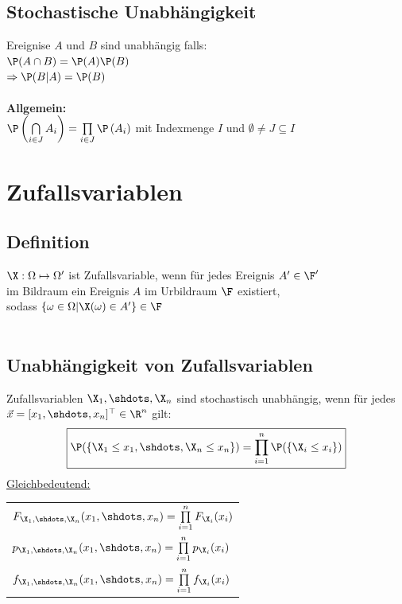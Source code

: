 \documentclass[german,color,6pt]{latex4ei/latex4ei_sheet}
\begin{document}
\begin{sectionbox}
	\subsection{Stochastische Unabhängigkeit}
	Ereignise $A$ und $B$ sind unabhängig falls:\\
	$\P(A \cap B) = \P(A)\P(B)$ \\
	$\Rightarrow \P(B|A)=\P(B)$  \\ \\
	\textbf{Allgemein:}  \\
	$\P\left(\bigcap\limits_{i \in J} A_i\right) = \prod\limits_{i \in J}\P\left(A_i\right)$
	mit Indexmenge $I$ und $\emptyset \neq J \subseteq I$
\end{sectionbox}


\section{Zufallsvariablen}
\begin{sectionbox}
	\subsection{Definition}
	$\X : \Omega \mapsto \Omega'$ ist Zufallsvariable, wenn für jedes Ereignis $A' \in \F'$  \\
	im Bildraum ein Ereignis $A$ im Urbildraum $\F$ existiert, \\
	sodass $\left\{\omega \in \Omega|\X(\omega) \in A'\right\} \in \F$\\ \\
\end{sectionbox}

\begin{sectionbox}
	\subsection{Unabhängigkeit von Zufallsvariablen}
	Zufallsvariablen $\X_1,\shdots,\X_n$ sind stochastisch unabhängig, wenn für jedes $\vec{x} = [x_1,\shdots,x_n]^\top \in \R^n$ gilt:
	\[\boxed{\P(\{\X_1 \leq x_1,\shdots,\X_n \leq x_n\}) = \prod\limits_{i=1}^{n}{\P(\{\X_i \leq x_i\})}}\]
	\underline{Gleichbedeutend:}\\
	\begin{tabular}{l}
		$F_{\X_1,\shdots,\X_n}(x_1,\shdots,x_n) = \prod\limits_{i=1}^{n}{F_{\X_i}(x_i)}$\\
		$p_{\X_1,\shdots,\X_n}(x_1,\shdots,x_n) = \prod\limits_{i=1}^{n}{p_{\X_i}(x_i)}$\\
		$f_{\X_1,\shdots,\X_n}(x_1,\shdots,x_n) = \prod\limits_{i=1}^{n}{f_{\X_i}(x_i)}$\\
	\end{tabular}
\end{sectionbox}
\end{document}
